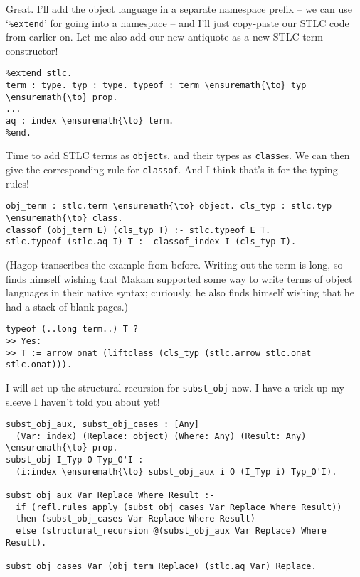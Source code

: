 \heroADVISOR{} Great. I'll add the object language in a separate namespace
prefix -- we can use `\texttt{\%extend}' for going into a namespace --
and I'll just copy-paste our STLC code from earlier on. Let me also add
our new antiquote as a new STLC term constructor!

\begin{verbatim}
%extend stlc.
term : type. typ : type. typeof : term \ensuremath{\to} typ \ensuremath{\to} prop.
...
aq : index \ensuremath{\to} term.
%end.
\end{verbatim}

\heroSTUDENT{} Time to add STLC terms as \texttt{object}s, and their types as
\texttt{class}es. We can then give the corresponding rule for
\texttt{classof}. And I think that's it for the typing rules!

\begin{verbatim}
obj_term : stlc.term \ensuremath{\to} object. cls_typ : stlc.typ \ensuremath{\to} class.
classof (obj_term E) (cls_typ T) :- stlc.typeof E T.
stlc.typeof (stlc.aq I) T :- classof_index I (cls_typ T).
\end{verbatim}

\begin{scenecomment}
(Hagop transcribes the example from before. Writing out the term is long, so finds himself
wishing that Makam supported some way to write terms of object languages in their native syntax;
curiously, he also finds himself wishing that he had a stack of blank pages.)
\end{scenecomment}

\begin{verbatim}
typeof (..long term..) T ?
>> Yes:
>> T := arrow onat (liftclass (cls_typ (stlc.arrow stlc.onat stlc.onat))).
\end{verbatim}



\heroADVISOR{} I will set up the structural recursion for \texttt{subst\_obj}
now. I have a trick up my sleeve I haven't told you about yet!

\begin{verbatim}
subst_obj_aux, subst_obj_cases : [Any]
  (Var: index) (Replace: object) (Where: Any) (Result: Any) \ensuremath{\to} prop.
subst_obj I_Typ O Typ_O'I :-
  (i:index \ensuremath{\to} subst_obj_aux i O (I_Typ i) Typ_O'I).

subst_obj_aux Var Replace Where Result :-
  if (refl.rules_apply (subst_obj_cases Var Replace Where Result))
  then (subst_obj_cases Var Replace Where Result)
  else (structural_recursion @(subst_obj_aux Var Replace) Where Result).

subst_obj_cases Var (obj_term Replace) (stlc.aq Var) Replace.
\end{verbatim}

